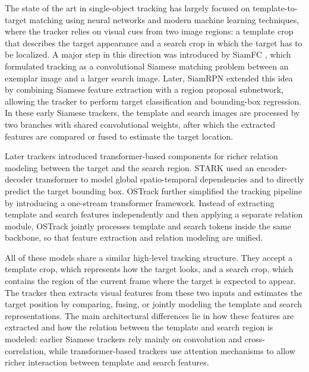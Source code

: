 \documentclass[bachelorthesis]{fer}
\numberwithin{equation}{chapter}
\begin{document}
    The state of the art in single-object tracking has largely focused on template-to-target
    matching using neural networks and modern machine learning techniques, where the tracker relies on visual cues from two image regions: a template
    crop that describes the target appearance and a search crop in which the target has to
    be localized. A major step in this direction was introduced by SiamFC \cite{bertinetto2016siamfc}, which
    formulated tracking as a convolutional Siamese matching problem between an
    exemplar image and a larger search image. Later, SiamRPN \cite{li2018siamrpn} extended this idea by
    combining Siamese feature extraction with a region proposal subnetwork, allowing the
    tracker to perform target classification and bounding-box regression. In these early
    Siamese trackers, the template and search images are processed by two branches with
    shared convolutional weights, after which the extracted features are compared or fused
    to estimate the target location.

    Later trackers introduced transformer-based components for richer relation modeling
    between the target and the search region. STARK \cite{yan2021stark} used an encoder-decoder
    transformer to model global spatio-temporal dependencies and to directly predict the
    target bounding box. OSTrack \cite{ye2022ostrack} further simplified the tracking pipeline by
    introducing a one-stream transformer framework. Instead of extracting template and
    search features independently and then applying a separate relation module, OSTrack
    jointly processes template and search tokens inside the same backbone, so that feature
    extraction and relation modeling are unified.

    All of these models share a similar high-level tracking structure. They accept a
    template crop, which represents how the target looks, and a search crop, which contains
    the region of the current frame where the target is expected to appear. The tracker then
    extracts visual features from these two inputs and estimates the target position by
    comparing, fusing, or jointly modeling the template and search representations. The main
    architectural differences lie in how these features are extracted and how the relation
    between the template and search region is modeled: earlier Siamese trackers rely mainly
    on convolution and cross-correlation, while transformer-based trackers use attention
    mechanisms to allow richer interaction between template and search features.
\end{document}
